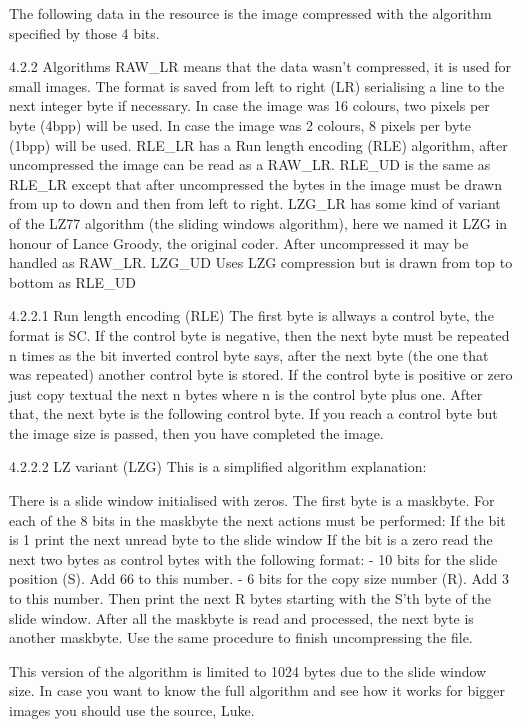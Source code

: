  The following data in the resource is the image compressed with the
 algorithm specified by those 4 bits.

4.2.2 Algorithms
 RAW_LR means that the data wasn't compressed, it is used for small images.
        The format is saved from left to right (LR) serialising a line to
        the next integer byte if necessary. In case the image was 16
        colours, two pixels per byte (4bpp) will be used. In case the image
        was 2 colours, 8 pixels per byte (1bpp) will be used.
 RLE_LR has a Run length encoding (RLE) algorithm, after uncompressed the
        image can be read as a RAW_LR.
 RLE_UD is the same as RLE_LR except that after uncompressed the bytes in
     the image must be drawn from up to down and then from left to right.
 LZG_LR has some kind of variant of the LZ77 algorithm (the sliding windows
        algorithm), here we named it LZG in honour of Lance Groody, the
        original coder.
        After uncompressed it may be handled as RAW_LR.
 LZG_UD Uses LZG compression but is drawn from top to bottom as RLE_UD

4.2.2.1 Run length encoding (RLE)
 The first byte is allways a control byte, the format is SC. If the control
 byte is negative, then the next byte must be repeated n times as the bit
 inverted control byte says, after the next byte (the one that was
 repeated)
 another control byte is stored.
 If the control byte is positive or zero just copy textual the next n bytes
 where n is the control byte plus one. After that, the next byte is the
 following control byte.
 If you reach a control byte but the image size is passed, then you have
 completed the image.

4.2.2.2 LZ variant (LZG)
 This is a simplified algorithm explanation:

 There is a slide window initialised with zeros.
 The first byte is a maskbyte.
 For each of the 8 bits in the maskbyte the next actions must be performed:
  If the bit is 1 print the next unread byte to the slide window
  If the bit is a zero read the next two bytes as control bytes with the
  following format:
   - 10 bits for the slide position (S). Add 66 to this number.
   - 6 bits for the copy size number (R). Add 3 to this number.
   Then print the next R bytes starting with the S'th byte of the slide
   window.
 After all the maskbyte is read and processed, the next byte is another
 maskbyte. Use the same procedure to finish uncompressing the file.

 This version of the algorithm is limited to 1024 bytes due to the slide
 window size. In case you want to know the full algorithm and see how it
 works for bigger images you should use the source, Luke.

